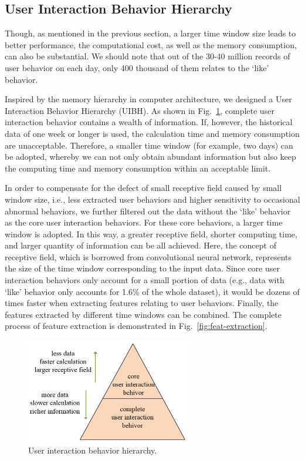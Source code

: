 \documentclass{article}
\begin{document}
\setlength{\parskip}{0pt}
\subsection{User Interaction Behavior Hierarchy}
\label{sec:user-interaction-behavior-hierarchy}

Though, as mentioned in the previous section, a larger time window size leads to better performance, the computational cost, as well as the memory consumption, can also be substantial. We should note that out of the 30-40 million records of user behavior on each day, only 400 thousand of them relates to the ‘like’ behavior.

Inspired by the memory hierarchy in computer architecture, we designed a User Interaction Behavior Hierarchy (UIBH). As shown in Fig.~\ref{fig:user-inter-behav-hierachy}, complete user interaction behavior contains a wealth of information. If, however, the historical data of one week or longer is used, the calculation time and memory consumption are unacceptable. Therefore, a smaller time window (for example, two days) can be adopted, whereby we can not only obtain abundant information but also keep the computing time and memory consumption within an acceptable limit.

In order to compensate for the defect of small receptive field caused by small window size, i.e., less extracted user behaviors and higher sensitivity to occasional abnormal behaviors, we further filtered out the data without the ‘like’ behavior as the core user interaction behaviors. For these core behaviors, a larger time window is adopted. In this way, a greater receptive field, shorter computing time, and larger quantity of information can be all achieved. Here, the concept of receptive field, which is borrowed from convolutional neural network, represents the size of the time window corresponding to the input data. Since core user interaction behaviors only account for a small portion of data (e.g., data with ‘like’ behavior only accounts for 1.6\% of the whole dataset), it would be dozens of times faster when extracting features relating to user behaviors. Finally, the features extracted by different time windows can be combined. The complete process of feature extraction is demonstrated in Fig.~\ref{fig:feat-extraction}.

\begin{figure}[h]
  \centering
  \includegraphics[width=7.2cm]{media/user-inter-behav-hierachy}
  \caption{User interaction behavior hierarchy.}
  \label{fig:user-inter-behav-hierachy}
\end{figure}
\end{document}
